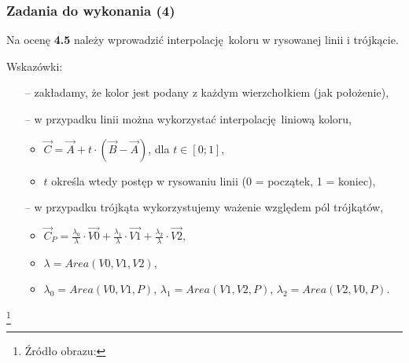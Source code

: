 \documentclass[usenames,dvipsnames,aspectratio=43,presentation]{beamer}
\begin{document}
    \begin{frame}
        \frametitle{Zadania do wykonania (4)}
        \footnotesize

        Na ocenę \textbf{4.5} należy wprowadzić interpolację koloru w rysowanej linii i trójkącie.

        \vfill

        Wskazówki:
        \vspace{-0.2em}
        \begin{itemize}
            \setlength{\itemsep}{-0.2em}
            \item[--] zakładamy, że kolor jest podany z każdym wierzchołkiem (jak położenie),
            \item[--] w przypadku linii można wykorzystać interpolację liniową koloru,
                      \vspace{-0.1em}
                      \begin{itemize}
                          \scriptsize
                          \item $\vec{C} = \vec{A} + t \cdot (\vec{B} - \vec{A})$, dla $t \in [0; 1]$,
                          \item $t$ określa wtedy postęp w rysowaniu linii (0 = początek, 1 = koniec),
                      \end{itemize}
            \item[--] w przypadku trójkąta wykorzystujemy ważenie względem pól trójkątów,
                      \vspace{-0.1em}
                      \begin{itemize}
                          \scriptsize
                          \item $\vec{C}_P = \frac{\lambda_0}{\lambda} \cdot \vec{V0} + \frac{\lambda_1}{\lambda} \cdot \vec{V1} + \frac{\lambda_2}{\lambda} \cdot \vec{V2}$,
                          \item $\lambda = Area(V0, V1, V2)$,
                          \item $\lambda_0 = Area(V0, V1, P)$, $\lambda_1 = Area(V1, V2, P)$, $\lambda_2 = Area(V2, V0, P)$.
                      \end{itemize}
        \end{itemize}

        \vfill

        \begin{minipage}{\textwidth}
            \centering

        \end{minipage}

        \let\thefootnote\relax\footnote[frame]{
            \tiny
            \hspace{-3.25em}
            Źródło obrazu:
        }
    \end{frame}
\end{document}
